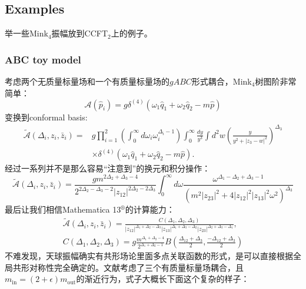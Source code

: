 \subsection{Examples}
举一些Mink$_4$振幅放到CCFT$_2$上的例子。
\subsubsection{ABC toy model}
考虑两个无质量标量场和一个有质量标量场的$gABC$形式耦合，Mink$_4$树图阶非常简单：
\begin{equation}
	\mathcal{A}(\hat{p}_i)=g\delta^{(4)}(\omega_1\hat{q}_1+\omega_2\hat{q}_2-m\hat{p})
\end{equation}
变换到conformal basis:
\begin{equation}
	\begin{aligned}
		\tilde{\mathcal{A}}(\Delta_{i},z_{i},\bar{z}_{i})=& g\prod_{i=1}^{2}\left(\int_{0}^{\infty}d\omega_{i}\omega_{i}^{\Delta_{i}-1}\right)\int_{0}^{\infty}\frac{dy}{y^{3}}\int d^{2}w\left(\frac{y}{y^{2}+|z_{3}-w|^{2}}\right)^{\Delta_{3}}  \\
		&\times\delta^{(4)}(\omega_{1}\hat{q}_{1}+\omega_{2}\hat{q}_{2}-m\hat{p}).
	\end{aligned}
\end{equation}
经过一系列并不是那么容易“注意到”的换元和积分操作\cite{Raclariu:2021zjz,Lam:2017ofc}：
\begin{equation}
	\widetilde{\mathcal{A}}(\Delta_i,z_i,\bar{z}_i)=\frac{gm^{2\Delta_2+\Delta_3-4}}{2^{2\Delta_2-\Delta_3-2}|z_{12}|^{2\Delta_2-2\Delta_3}}\int_0^\infty d\omega\frac{\omega^{\Delta_1-\Delta_2+\Delta_3-1}}{(m^2|z_{23}|^2+4|z_{12}|^2|z_{13}|^2\omega^2)^{\Delta_3}}
\end{equation}
最后让我们相信Mathematica 13$^\circledR$的计算能力：
\begin{equation}\label{48.132}
	\begin{gathered}
		\widetilde{\mathcal{A}}(\Delta_i,z_i,\bar{z}_i) =\frac{C(\Delta_1,\Delta_2,\Delta_3)}{|z_{12}|^{\Delta_1+\Delta_2-\Delta_3}|z_{13}|^{\Delta_1+\Delta_3-\Delta_2}|z_{23}|^{\Delta_2+\Delta_3-\Delta_1}}, \\
		C(\Delta_{1},\Delta_{2},\Delta_{3}) =g\frac{m^{\Delta_1+\Delta_2-4}}{2^{\Delta_1+\Delta_2-1}}B\left(\frac{\Delta_{12}+\Delta_3}2,\frac{-\Delta_{12}+\Delta_3}2\right)
	\end{gathered}
\end{equation}
不难发现，天球振幅确实有共形场论里面多点关联函数的形式，是可以直接根据全局共形对称性完全确定的。文献\cite{Pasterski:2016qvg}考虑了三个有质量标量场耦合，且$m_{\text{in}}=(2+\epsilon)m_{\text{out}}$的渐近行为，式子大概长下面这个复杂的样子：
